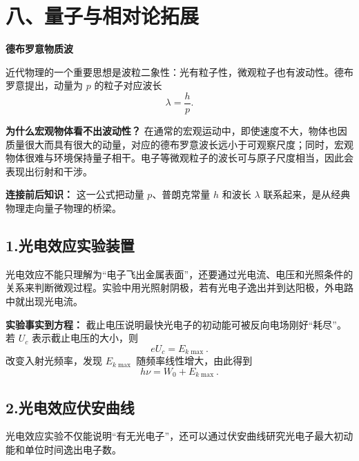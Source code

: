 \section*{八、量子与相对论拓展}
\begin{competitionbox}
\textbf{德布罗意物质波}

近代物理的一个重要思想是波粒二象性：光有粒子性，微观粒子也有波动性。德布罗意提出，动量为 $p$ 的粒子对应波长
\[
\lambda=\frac{h}{p}.
\]

\textbf{为什么宏观物体看不出波动性？}
在通常的宏观运动中，即使速度不大，物体也因质量很大而具有很大的动量，对应的德布罗意波长远小于可观察尺度；同时，宏观物体很难与环境保持量子相干。电子等微观粒子的波长可与原子尺度相当，因此会表现出衍射和干涉。

\begin{center}

\end{center}

\textbf{连接前后知识：} 这一公式把动量 $p$、普朗克常量 $h$ 和波长 $\lambda$ 联系起来，是从经典物理走向量子物理的桥梁。
\end{competitionbox}

\subsection*{1.\quad 光电效应实验装置}

光电效应不能只理解为“电子飞出金属表面”，还要通过光电流、电压和光照条件的关系来判断微观过程。实验中用光照射阴极，若有光电子逸出并到达阳极，外电路中就出现光电流。

\begin{center}


\label{fig:photoelectric-experiment}
\end{center}

\textbf{实验事实到方程：} 截止电压说明最快光电子的初动能可被反向电场刚好“耗尽”。若 $U_c$ 表示截止电压的大小，则
\[
eU_c=E_{k\max}.
\]
改变入射光频率，发现 $E_{k\max}$ 随频率线性增大，由此得到
\[
h\nu=W_0+E_{k\max}.
\]

\subsection*{2.\quad 光电效应伏安曲线}

光电效应实验不仅能说明“有无光电子”，还可以通过伏安曲线研究光电子最大初动能和单位时间逸出电子数。

